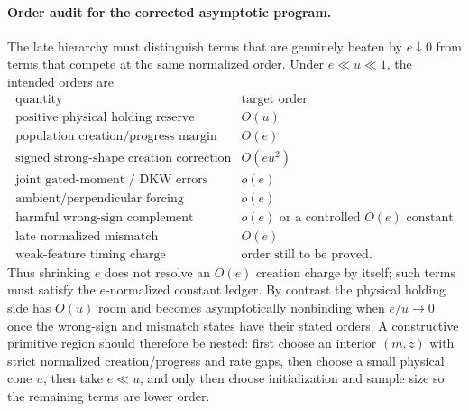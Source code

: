 \documentclass{article} %
\theoremstyle{plain}
\theoremstyle{definition}
\theoremstyle{remark}
\begin{document}
\paragraph{Order audit for the corrected asymptotic program.}
The late hierarchy must distinguish terms that are genuinely beaten by
$e\downarrow0$ from terms that compete at the same normalized order.  Under
$e\ll u\ll1$, the intended orders are
\[
\begin{array}{c|c}
\text{quantity}&\text{target order}\\ \hline
\text{positive physical holding reserve}&O(u)\\
\text{population creation/progress margin}&O(e)\\
\text{signed strong-shape creation correction}&O(eu^2)\\
\text{joint gated-moment / DKW errors}&o(e)\\
\text{ambient/perpendicular forcing}&o(e)\\
\text{harmful wrong-sign complement}&o(e)\text{ or a controlled }O(e)\text{ constant}\\
\text{late normalized mismatch}&O(e)\\
\text{weak-feature timing charge}&\text{order still to be proved.}
\end{array}
\]
Thus shrinking $e$ does not resolve an $O(e)$ creation charge by itself; such
terms must satisfy the $e$-normalized constant ledger.  By contrast the
physical holding side has $O(u)$ room and becomes asymptotically nonbinding
when $e/u\to0$ once the wrong-sign and mismatch states have their stated
orders.  A constructive primitive region should therefore be nested: first
choose an interior $(m,z)$ with strict normalized creation/progress and rate
gaps, then choose a small physical cone $u$, then take $e\ll u$, and only
then choose initialization and sample size so the remaining terms are lower
order.
\end{document}
